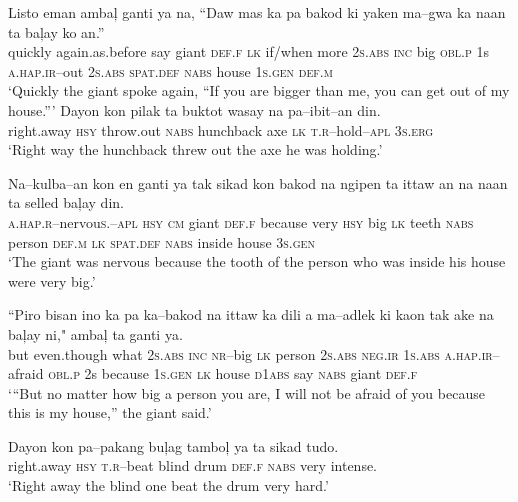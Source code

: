 \ea
\gll Listo  eman  amba\c{l}  ganti  ya  na,  “Daw  mas  ka  pa   bakod  ki  yaken  ma--gwa  ka  naan  ta  ba\c{l}ay   ko  an.” \\
quickly  again.as.before  say  giant  \textsc{def.f}  \textsc{lk}  if/when  more  2\textsc{s.abs}  \textsc{inc} big  \textsc{obl.p}  1s  \textsc{a.hap.ir}--out  2\textsc{s.abs}  \textsc{spat.def}  \textsc{nabs}  house
1\textsc{s.gen}  \textsc{def.m} \\
\glt ‘Quickly the giant spoke again, “If you are bigger than me, you can get out of my house.”’
\z
\ea
\gll  Dayon  kon  pilak  ta  buktot  wasay  na  pa--ibit--an  din. \\
right.away  \textsc{hsy}  throw.out  \textsc{nabs}  hunchback  axe  \textsc{lk}  \textsc{t.r}--hold--\textsc{apl}  3\textsc{s.erg} \\
\glt ‘Right way the hunchback threw out the axe he was holding.’
\z

\ea
\gll  Na--kulba--an  kon  en  ganti  ya  tak  sikad  kon   bakod  na  ngipen  ta  ittaw  an  na  naan  ta  selled   ba\c{l}ay  din. \\
\textsc{a.hap.r--}nervou\textsc{s.--apl}  \textsc{hsy}  \textsc{cm}  giant  \textsc{def.f}  because  very  \textsc{hsy} big  \textsc{lk}  teeth  \textsc{nabs}  person  \textsc{def.m}  \textsc{lk}  \textsc{spat.def}  \textsc{nabs}  inside house  3\textsc{s.gen} \\
\glt ‘The giant was nervous because the tooth of the person who was inside his house were very big.’
\z

\ea
\gll  ``Piro  bisan  ino  ka  pa  ka--bakod  na  ittaw  ka   dili  a  ma--adlek  ki  kaon  tak  ake  na   ba\c{l}ay  ni,"  amba\c{l}  ta  ganti  ya. \\
but  even.though  what  2\textsc{s.abs}  \textsc{inc}  \textsc{nr}--big  \textsc{lk}  person  2\textsc{s.abs}
\textsc{neg.ir}  1\textsc{s.abs}  \textsc{a.hap.ir}--afraid  \textsc{obl.p}  2s  because  1\textsc{s.gen}  \textsc{lk}
house  \textsc{d1abs}  say  \textsc{nabs}  giant  \textsc{def.f} \\
\glt ‘“But no matter how big a person you are, I will not be afraid of you because this is my house,” the giant said.’
\z

\ea
\gll  Dayon  kon  pa--pakang  bu\c{l}ag  tambo\c{l}  ya  ta  sikad  tudo. \\
right.away  \textsc{hsy}  \textsc{t.r}--beat  blind  drum  \textsc{def.f}  \textsc{nabs}  very  intense. \\
\glt ‘Right away the blind one beat the drum very hard.’
\z

